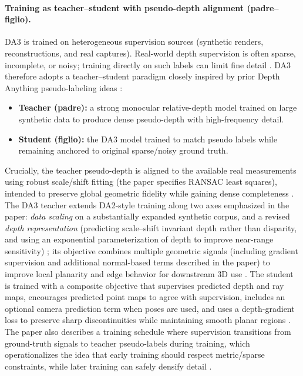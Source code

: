 \paragraph{Training as teacher--student with pseudo-depth alignment (padre--figlio).}
DA3 is trained on heterogeneous supervision sources (synthetic renders, reconstructions, and real captures). Real-world depth supervision is often sparse, incomplete, or noisy; training directly on such labels can limit fine detail \cite{lin2025depthanything3}. DA3 therefore adopts a teacher--student paradigm closely inspired by prior Depth Anything pseudo-labeling ideas \cite{yang2024depth,yang2024depthanythingv2}:
\begin{itemize}
    \item \textbf{Teacher (padre):} a strong monocular relative-depth model trained on large synthetic data to produce dense pseudo-depth with high-frequency detail.
    \item \textbf{Student (figlio):} the DA3 model trained to match pseudo labels while remaining anchored to original sparse/noisy ground truth.
\end{itemize}
Crucially, the teacher pseudo-depth is aligned to the available real measurements using robust scale/shift fitting (the paper specifies RANSAC least squares), intended to preserve global geometric fidelity while gaining dense completeness \cite{lin2025depthanything3}. The DA3 teacher extends DA2-style training along two axes emphasized in the paper: \emph{data scaling} on a substantially expanded synthetic corpus, and a revised \emph{depth representation} (predicting scale--shift invariant depth rather than disparity, and using an exponential parameterization of depth to improve near-range sensitivity) \cite{yang2024depthanythingv2,lin2025depthanything3}; its objective combines multiple geometric signals (including gradient supervision and additional normal-based terms described in the paper) to improve local planarity and edge behavior for downstream 3D use \cite{lin2025depthanything3}. The student is trained with a composite objective that supervises predicted depth and ray maps, encourages predicted point maps to agree with supervision, includes an optional camera prediction term when poses are used, and uses a depth-gradient loss to preserve sharp discontinuities while maintaining smooth planar regions \cite{lin2025depthanything3}. The paper also describes a training schedule where supervision transitions from ground-truth signals to teacher pseudo-labels during training, which operationalizes the idea that early training should respect metric/sparse constraints, while later training can safely densify detail \cite{lin2025depthanything3}.

